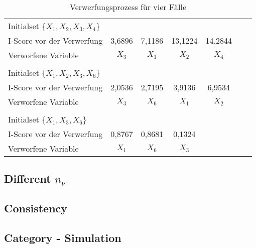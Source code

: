 \documentclass[Research_Module_ES.tex]{subfiles}
\begin{document}
\begin{table}[htb]
\begin{tabular}{lcccccc}
		{\scriptsize Initialset $\{X_{1},X_{2},X_{3},X_{4}\}$}\\
		{\scriptsize I-Score vor der Verwerfung}& \scriptsize 3,6896 & \scriptsize 7,1186 &\scriptsize 13,1224 & \scriptsize 14,2844 & & \\
		\scriptsize Verworfene Variable& \scriptsize $X_{3}$ &\scriptsize $X_{1}$ & \scriptsize $X_{2}$ &\scriptsize $X_{4}$ & & \\
		& & & & & &\\
		{\scriptsize Initialset $\{X_{1},X_{2},X_{3},X_{6}\}$}\\
		{\scriptsize I-Score vor der Verwerfung}& \scriptsize 2,0536 & \scriptsize 2,7195 &\scriptsize 3,9136 & \scriptsize 6,9534 & & \\
		\scriptsize Verworfene Variable& \scriptsize $X_{3}$ &\scriptsize $X_{6}$ & \scriptsize $X_{1}$ &\scriptsize $X_{2}$ & & \\
		& & & & & &\\
		{\scriptsize Initialset $\{X_{1},X_{3},X_{6}\}$}\\
		{\scriptsize I-Score vor der Verwerfung}& \scriptsize 0,8767 & \scriptsize 0,8681 &\scriptsize 0,1324 & & & \\
		\scriptsize Verworfene Variable& \scriptsize $X_{1}$ &\scriptsize $X_{6}$ & \scriptsize $X_{3}$ & & & \\
		\bottomrule
	\end{tabular}
	\caption{Verwerfungsprozess für vier Fälle}
\end{table}

\subsection{Different $n_{\nu}$}


\subsection{Consistency}

\subsection{Category  - Simulation}
\end{document}
